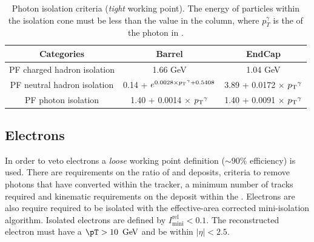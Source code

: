 \begin{table}[ht!]
  \caption{Photon isolation criteria (\emph{tight} working point). The
  energy of particles within the isolation cone must be less than the
  value in the column, where $p_T^{\gamma}$ is the \pT of the photon
  in \gev.\label{tab:photon-id-gamma}}
  \centering
  \footnotesize
  \begin{tabular}{ ccc }
    Categories                    & Barrel                             & EndCap                             \\
    \hline
    PF charged hadron isolation   & 1.66 GeV & 1.04 GeV                          \\
    PF neutral hadron isolation   & 0.14 + $ e^{0.0028 \times {p_{\text T}}^{\gamma} + 0.5408}$  &  3.89 + 0.0172 $\times$ ${p_{\text T}}^{\gamma}$\\
    PF photon isolation           & 1.40 + 0.0014 $\times$ ${p_{\text T}}^{\gamma}$ & 1.40 + 0.0091 $\times$ ${p_{\text T}}^{\gamma}$ \\
  \end{tabular}
  \end{table}

\subsection{Electrons}
\label{sec:electron-id}

In order to veto electrons a \emph{loose} working point definition
($\sim90\%$ efficiency) is used. There are requirements on the
ratio of \HCAL and \ECAL deposits, criteria to remove photons that
have converted within the tracker, a minimum number of tracks required
and kinematic requirements on the deposit within the \ECAL. Electrons
are also require required to be isolated with the effective-area
corrected mini-isolation algorithm.  Isolated electrons are defined by
$I^{\textrm{rel}}_{\textrm{mini}} < 0.1$. The reconstructed electron
must have a $\pT>10~\gev$ and be within $|\eta|<2.5$.

